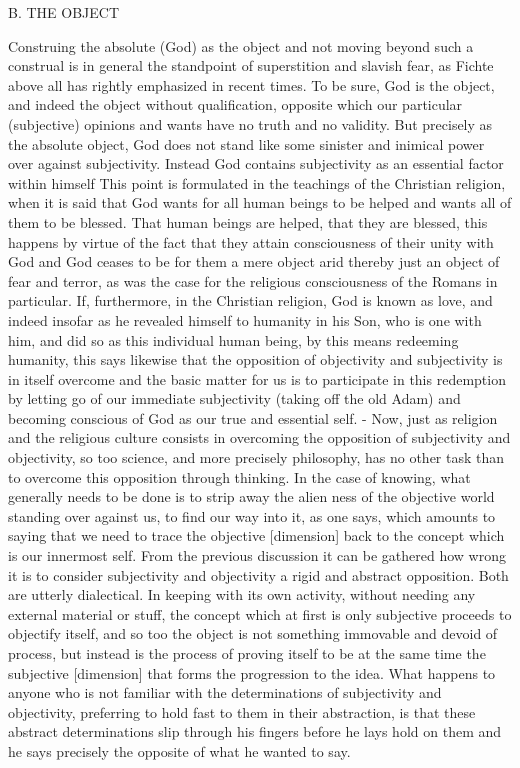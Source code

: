 B. THE OBJECT

Construing the absolute (God) as the object and not moving beyond
such a construal is in general the standpoint of superstition and slavish fear, as
Fichte above all has rightly emphasized in recent times. To be sure, God is the
object, and indeed the object without qualification, opposite which our particular
(subjective) opinions and wants have no truth and no validity. But precisely as
the absolute object, God does not stand like some sinister and inimical power
over against subjectivity. Instead God contains subjectivity as an essential factor
within himself This point is formulated in the teachings of the Christian religion,
when it is said that God wants for all human beings to be helped and wants all
of them to be blessed. That human beings are helped, that they are blessed, this
happens by virtue of the fact that they attain consciousness of their unity with
God and God ceases to be for them a mere object arid thereby just an object
of fear and terror, as was the case for the religious consciousness of
the Romans in particular. If, furthermore, in the Christian religion, God is known
as love, and indeed insofar as he revealed himself to humanity in his
Son, who is one with him, and did so as this individual human being, by this
means redeeming humanity, this says likewise that the opposition of objectivity
and subjectivity is in itself overcome and the basic matter for us is to participate
in this redemption by letting go of our immediate subjectivity (taking off the old
Adam) and becoming conscious of God as our true and essential self. - Now,
just as religion and the religious culture consists in overcoming the opposition
of subjectivity and objectivity, so too science, and more precisely philosophy, has
no other task than to overcome this opposition through thinking. In the case of
knowing, what generally needs to be done is to strip away the alien ness of the
objective world standing over against us, to find our way into it, as one says,
which amounts to saying that we need to trace the objective [dimension] back
to the concept which is our innermost self. From the previous discussion it can
be gathered how wrong it is to consider subjectivity and objectivity a rigid and
abstract opposition. Both are utterly dialectical. In keeping with its own activity,
without needing any external material or stuff, the concept which at first is only
subjective proceeds to objectify itself, and so too the object is not something
immovable and devoid of process, but instead is the process of proving itself to
be at the same time the subjective [dimension] that forms the progression to the
idea. What happens to anyone who is not familiar with the determinations of
subjectivity and objectivity, preferring to hold fast to them in their abstraction, is
that these abstract determinations slip through his fingers before he lays hold on
them and he says precisely the opposite of what he wanted to say.

